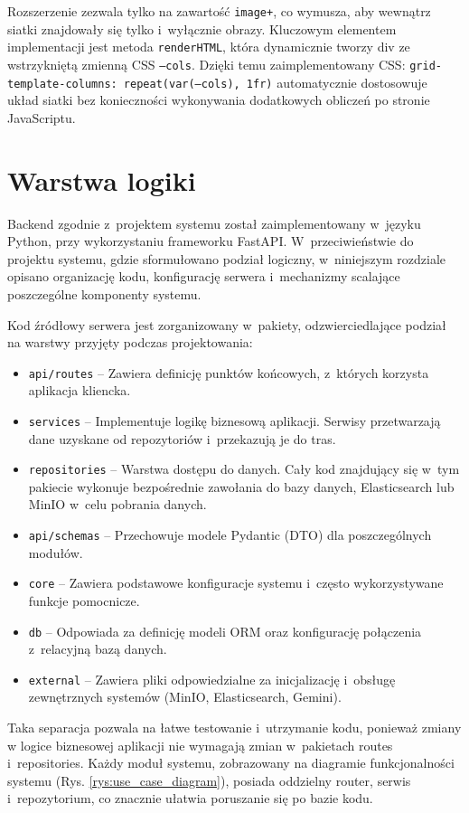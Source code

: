 Rozszerzenie zezwala tylko na zawartość \texttt{image+}, co wymusza, aby wewnątrz siatki znajdowały się tylko i~wyłącznie obrazy.
Kluczowym elementem implementacji jest metoda \texttt{renderHTML}, która dynamicznie tworzy div ze wstrzykniętą zmienną CSS \texttt{--cols}.
Dzięki temu zaimplementowany CSS: \texttt{grid-template-columns: repeat(var(--cols), 1fr)} automatycznie dostosowuje układ siatki 
bez konieczności wykonywania dodatkowych obliczeń po stronie JavaScriptu.

\section{Warstwa logiki}
Backend zgodnie z~projektem systemu został zaimplementowany w~języku Python, przy wykorzystaniu 
frameworku FastAPI. W~przeciwieństwie do projektu systemu, gdzie sformułowano podział logiczny, w~niniejszym rozdziale
opisano organizację kodu, konfigurację serwera i~mechanizmy scalające poszczególne komponenty systemu.

Kod źródłowy serwera jest zorganizowany w~pakiety, odzwierciedlające podział na warstwy przyjęty podczas projektowania:
\begin{itemize}
    \item {\texttt{api/routes}} -- Zawiera definicję punktów końcowych, z~których korzysta aplikacja kliencka.
    \item {\texttt{services}} -- Implementuje logikę biznesową aplikacji. Serwisy przetwarzają dane uzyskane od repozytoriów 
    i~przekazują je do tras.
    \item {\texttt{repositories}} -- Warstwa dostępu do danych. Cały kod znajdujący się w~tym pakiecie wykonuje bezpośrednie 
    zawołania do bazy danych, Elasticsearch lub MinIO w~celu pobrania danych.
    \item {\texttt{api/schemas}} -- Przechowuje modele Pydantic (DTO) dla poszczególnych modułów.
    \item {\texttt{core}} -- Zawiera podstawowe konfiguracje systemu i~często wykorzystywane funkcje pomocnicze.
    \item {\texttt{db}} -- Odpowiada za definicję modeli ORM oraz konfigurację połączenia z~relacyjną bazą danych.
    \item {\texttt{external}} -- Zawiera pliki odpowiedzialne za inicjalizację i~obsługę zewnętrznych systemów 
    (MinIO, Elasticsearch, Gemini).
\end{itemize}
Taka separacja pozwala na łatwe testowanie i~utrzymanie kodu, ponieważ zmiany 
w logice biznesowej aplikacji nie wymagają zmian w~pakietach routes i~repositories.
Każdy moduł systemu, zobrazowany na diagramie funkcjonalności systemu 
(Rys. \ref{rys:use_case_diagram}), posiada oddzielny router, serwis i~repozytorium, 
co znacznie ułatwia poruszanie się po bazie kodu. 

